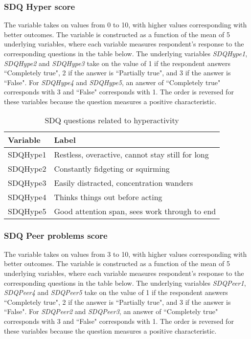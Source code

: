 \subsubsection{SDQ Hyper score}
The variable takes on values from 0 to 10, with higher values corresponding with better outcomes. The variable is constructed as a function of the mean of 5 underlying variables, where each variable measures respondent's response to the corresponding questions in the table below. The underlying variables \textit{SDQHype1}, \textit{SDQHype2} and \textit{SDQHype3} take on the value of 1 if the respondent answers  ``Completely true", 2 if the answer is ``Partially true", and 3 if the answer is ``False". For \textit{SDQHype4} and \textit{SDQHype5}, an answer of ``Completely true" corresponds with 3 and ``False" corresponds with 1. The order is reversed for these variables because the question measures a positive characteristic. \\

\begin{table}[H]
\begin{center}
\footnotesize{
\caption{SDQ questions related to hyperactivity}
\begin{tabular}{l l}
\hline
\textbf{Variable} & \textbf{Label} \\
\hline
SDQHype1 & Restless, overactive, cannot stay still for long\\
SDQHype2 & Constantly fidgeting or squirming\\
SDQHype3 & Easily distracted, concentration wanders\\
SDQHype4 & Thinks things out before acting \\
SDQHype5 & Good attention span, sees work through to end\\
\hline
\end{tabular}
}
\end{center}
\end{table}

\subsubsection{SDQ Peer problems score}
The variable takes on values from 3 to 10, with higher values corresponding with better outcomes. The variable is constructed as a function of the mean of 5 underlying variables, where each variable measures respondent's response to the corresponding questions in the table below. The underlying variables \textit{SDQPeer1}, \textit{SDQPeer4} and \textit{SDQPeer5} take on the value of 1 if the respondent answers  ``Completely true", 2 if the answer is ``Partially true", and 3 if the answer is ``False". For \textit{SDQPeer2} and \textit{SDQPeer3}, an answer of ``Completely true" corresponds with 3 and ``False" corresponds with 1. The order is reversed for these variables because the question measures a positive characteristic. \\

